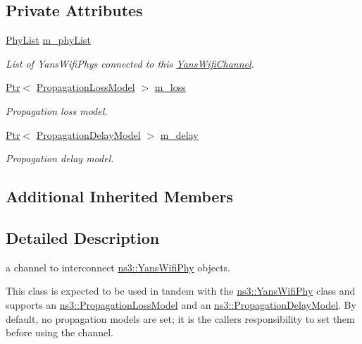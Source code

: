 \subsection*{Private Attributes}
\begin{DoxyCompactItemize}
\item 
\hyperlink{classns3_1_1YansWifiChannel_a49f4404f431d6221a172f9c6315f8f6a}{Phy\+List} \hyperlink{classns3_1_1YansWifiChannel_a6a5b45c318c8039e4bb6846b0a58c2e3}{m\+\_\+phy\+List}
\begin{DoxyCompactList}\small\item\em List of Yans\+Wifi\+Phys connected to this \hyperlink{classns3_1_1YansWifiChannel}{Yans\+Wifi\+Channel}. \end{DoxyCompactList}\item 
\hyperlink{classns3_1_1Ptr}{Ptr}$<$ \hyperlink{classns3_1_1PropagationLossModel}{Propagation\+Loss\+Model} $>$ \hyperlink{classns3_1_1YansWifiChannel_a7ac546c96799f5b8e02179a67d074eef}{m\+\_\+loss}
\begin{DoxyCompactList}\small\item\em Propagation loss model. \end{DoxyCompactList}\item 
\hyperlink{classns3_1_1Ptr}{Ptr}$<$ \hyperlink{classns3_1_1PropagationDelayModel}{Propagation\+Delay\+Model} $>$ \hyperlink{classns3_1_1YansWifiChannel_a3abdf11e233502f00d96239c50f1409e}{m\+\_\+delay}
\begin{DoxyCompactList}\small\item\em Propagation delay model. \end{DoxyCompactList}\end{DoxyCompactItemize}
\subsection*{Additional Inherited Members}


\subsection{Detailed Description}
a channel to interconnect \hyperlink{classns3_1_1YansWifiPhy}{ns3\+::\+Yans\+Wifi\+Phy} objects.

This class is expected to be used in tandem with the \hyperlink{classns3_1_1YansWifiPhy}{ns3\+::\+Yans\+Wifi\+Phy} class and supports an \hyperlink{classns3_1_1PropagationLossModel}{ns3\+::\+Propagation\+Loss\+Model} and an \hyperlink{classns3_1_1PropagationDelayModel}{ns3\+::\+Propagation\+Delay\+Model}. By default, no propagation models are set; it is the caller\textquotesingle{}s responsibility to set them before using the channel. 

